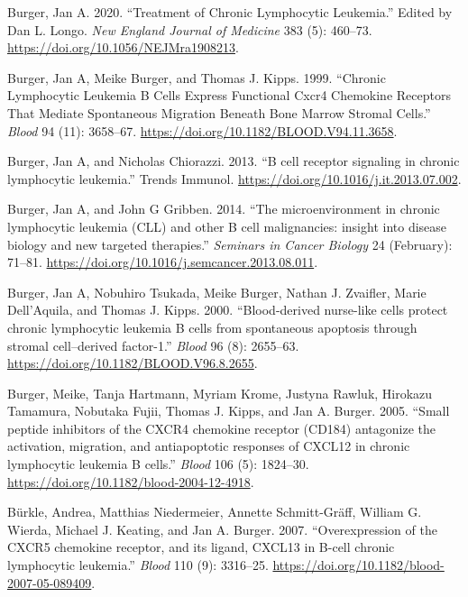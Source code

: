\documentclass[11pt, a4paper, twosided]{book}
\newenvironment{CSLReferences}%
  {}%
  {\par}
\begin{document}
\begin{CSLReferences}{1}{0}
\leavevmode{}%
Burger, Jan A. 2020. {``{Treatment of Chronic Lymphocytic Leukemia}.''} Edited by Dan L. Longo. \emph{New England Journal of Medicine} 383 (5): 460--73. \url{https://doi.org/10.1056/NEJMra1908213}.

\leavevmode{}%
Burger, Jan A, Meike Burger, and Thomas J. Kipps. 1999. {``{Chronic Lymphocytic Leukemia B Cells Express Functional Cxcr4 Chemokine Receptors That Mediate Spontaneous Migration Beneath Bone Marrow Stromal Cells}.''} \emph{Blood} 94 (11): 3658--67. \url{https://doi.org/10.1182/BLOOD.V94.11.3658}.

\leavevmode{}%
Burger, Jan A, and Nicholas Chiorazzi. 2013. {``{B cell receptor signaling in chronic lymphocytic leukemia}.''} Trends Immunol. \url{https://doi.org/10.1016/j.it.2013.07.002}.

\leavevmode{}%
Burger, Jan A, and John G Gribben. 2014. {``{The microenvironment in chronic lymphocytic leukemia (CLL) and other B cell malignancies: insight into disease biology and new targeted therapies.}''} \emph{Seminars in Cancer Biology} 24 (February): 71--81. \url{https://doi.org/10.1016/j.semcancer.2013.08.011}.

\leavevmode{}%
Burger, Jan A, Nobuhiro Tsukada, Meike Burger, Nathan J. Zvaifler, Marie Dell'Aquila, and Thomas J. Kipps. 2000. {``{Blood-derived nurse-like cells protect chronic lymphocytic leukemia B cells from spontaneous apoptosis through stromal cell--derived factor-1}.''} \emph{Blood} 96 (8): 2655--63. \url{https://doi.org/10.1182/BLOOD.V96.8.2655}.

\leavevmode{}%
Burger, Meike, Tanja Hartmann, Myriam Krome, Justyna Rawluk, Hirokazu Tamamura, Nobutaka Fujii, Thomas J. Kipps, and Jan A. Burger. 2005. {``{Small peptide inhibitors of the CXCR4 chemokine receptor (CD184) antagonize the activation, migration, and antiapoptotic responses of CXCL12 in chronic lymphocytic leukemia B cells}.''} \emph{Blood} 106 (5): 1824--30. \url{https://doi.org/10.1182/blood-2004-12-4918}.

\leavevmode{}%
Bürkle, Andrea, Matthias Niedermeier, Annette Schmitt-Gräff, William G. Wierda, Michael J. Keating, and Jan A. Burger. 2007. {``{Overexpression of the CXCR5 chemokine receptor, and its ligand, CXCL13 in B-cell chronic lymphocytic leukemia}.''} \emph{Blood} 110 (9): 3316--25. \url{https://doi.org/10.1182/blood-2007-05-089409}.


\end{CSLReferences}
\end{document}
